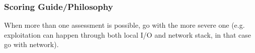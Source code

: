 \documentclass[a4paper, 10pt, titlepage]{article}
\begin{document}
\subsubsection*{Scoring Guide/Philosophy}
When more than one assessment is possible, go with the more severe one (e.g. exploitation can happen through both local I/O and network stack, in that case go with network).
\end{document}
